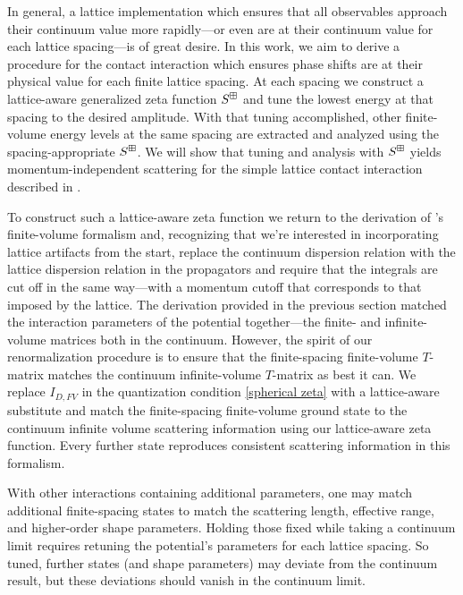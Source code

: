 In general, a lattice implementation which ensures that all observables approach their continuum value more rapidly---or even are at their continuum value for each lattice spacing---is of great desire.
In this work, we aim to derive a procedure for the contact interaction which ensures phase shifts are at their physical value for each finite lattice spacing.
At each spacing we construct a lattice-aware generalized \Luscher zeta function $S^{\boxplus}$ and tune the lowest energy at that spacing to the desired amplitude.
With that tuning accomplished, other finite-volume energy levels at the same spacing are extracted and analyzed using the spacing-appropriate $S^{\boxplus}$.
We will show that tuning and analysis with $S^{\boxplus}$ yields momentum-independent scattering for the simple lattice contact interaction described in .

To construct such a lattice-aware zeta function we return to the derivation of \Luscher's finite-volume formalism and, recognizing that we're interested in incorporating lattice artifacts from the start, replace the continuum dispersion relation with the lattice dispersion relation in the propagators and require that the integrals are cut off in the same way---with a momentum cutoff that corresponds to that imposed by the lattice.
The derivation provided in the previous section matched the interaction parameters of the potential together---the finite- and infinite-volume matrices both in the continuum.
However, the spirit of our renormalization procedure is to ensure that the finite-spacing finite-volume $T$-matrix matches the continuum infinite-volume $T$-matrix as best it can.
We replace $I_{D,FV}$ in the quantization condition \eqref{spherical zeta} with a lattice-aware substitute and match the finite-spacing finite-volume ground state to the continuum infinite volume scattering information using our  lattice-aware zeta function.
Every further state reproduces consistent scattering information in this formalism.

With other interactions containing additional parameters, one may match additional finite-spacing states to match the scattering length, effective range, and higher-order shape parameters.
Holding those fixed while taking a continuum limit requires retuning the potential's parameters for each lattice spacing.
So tuned, further states (and shape parameters) may deviate from the continuum result, but these deviations should vanish in the continuum limit.


